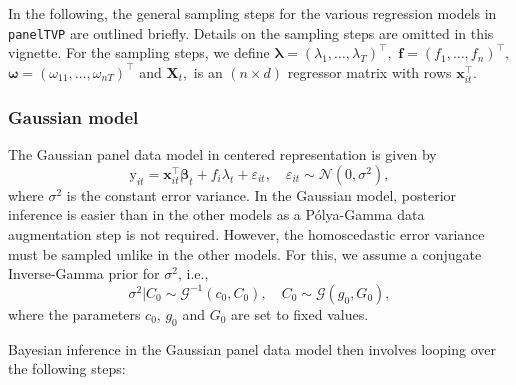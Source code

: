\documentclass[a4paper, preprint, 3p,
authoryear]{elsarticle} %
\begin{document}
In the following, the general sampling steps for the various regression
models in \texttt{panelTVP} are outlined briefly. Details on the
sampling steps are omitted in this vignette. For the sampling steps, we
define \(\boldsymbol{\lambda} = (\lambda_1,\dots,\lambda_T)^\top,\)
\(\mathbf{f} = (f_1,\dots,f_n)^\top,\)
\(\boldsymbol{\omega}=(\omega_{11},\dots,\omega_{nT})^\top\) and
\(\textbf{X}_t,\) is an \((n\times d)\) regressor matrix with rows
\(\textbf{x}_{it}^\top.\)

\subsubsection{Gaussian model}\label{gaussian-model}

The Gaussian panel data model in centered representation is given by
\begin{equation*}
 \text{y}_{it} = \textbf{x}_{it}^\top \boldsymbol{\beta}_t + f_i\lambda_t + \varepsilon_{it}, \quad \varepsilon_{it} \sim \mathcal{N}(0,\sigma^2),
\end{equation*} where \(\sigma^2\) is the constant error variance. In
the Gaussian model, posterior inference is easier than in the other
models as a Pólya-Gamma data augmentation step is not required. However,
the homoscedastic error variance must be sampled unlike in the other
models. For this, we assume a conjugate Inverse-Gamma prior for
\(\sigma^2\), i.e., \begin{equation*}
 \sigma^2|C_0 \sim \mathcal{G}^{-1}(c_0, C_0), \quad C_0 \sim \mathcal{G}(g_0,G_0),
\end{equation*} where the parameters \(c_0\), \(g_0\) and \(G_0\) are
set to fixed values.

Bayesian inference in the Gaussian panel data model then involves
looping over the following steps:
\end{document}
